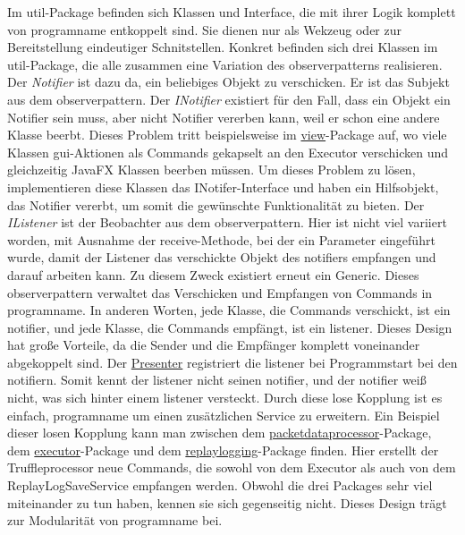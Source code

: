 \medskip
Im util-Package befinden sich Klassen und Interface, die mit ihrer Logik komplett von \gls{programname} entkoppelt sind.
Sie dienen nur als Wekzeug oder zur Bereitstellung eindeutiger Schnitstellen. Konkret befinden sich drei Klassen im util-Package, die alle zusammen eine
Variation des \gls{observerpattern}s realisieren. Der \textit{Notifier} ist dazu da,
ein beliebiges Objekt zu verschicken. Er ist das Subjekt aus
dem \gls{observerpattern}.
\newline
\newline
Der \textit{INotifier} existiert für den Fall, dass ein
Objekt ein Notifier sein muss, aber nicht Notifier vererben kann, weil er
schon eine andere Klasse beerbt. Dieses Problem tritt beispielsweise im
\hyperref[subsec:view]{view}-Package auf, wo viele Klassen \gls{gui}-Aktionen als Commands
gekapselt an den Executor verschicken und gleichzeitig JavaFX Klassen beerben müssen.
Um dieses Problem zu lösen, implementieren diese Klassen das INotifer-Interface
und haben ein Hilfsobjekt, das Notifier vererbt, um somit die gewünschte Funktionalität zu
bieten.
\newline
\newline
Der \textit{IListener} ist der Beobachter aus dem \gls{observerpattern}. Hier ist nicht
viel variiert worden, mit Ausnahme der receive-Methode, bei der ein Parameter eingeführt
wurde, damit der Listener das verschickte Objekt des \gls{notifier}s empfangen und darauf arbeiten kann. Zu diesem Zweck existiert erneut ein Generic.
\newline
\newline
Dieses \gls{observerpattern} verwaltet das Verschicken und Empfangen von Commands in
\gls{programname}. In anderen Worten, jede Klasse, die Commands verschickt, ist ein
\gls{notifier}, und jede Klasse, die Commands empfängt, ist ein \gls{listener}. Dieses Design
hat große Vorteile, da die Sender und die Empfänger komplett voneinander abgekoppelt
sind. Der \hyperref[subsec:presenter]{Presenter} registriert die \gls{listener} bei Programmstart
bei den \gls{notifier}n. Somit kennt der \gls{listener} nicht seinen \gls{notifier}, und der
\gls{notifier} weiß nicht, was sich hinter einem \gls{listener} versteckt. Durch diese lose
Kopplung ist es einfach, \gls{programname} um einen zusätzlichen Service zu erweitern.
\newline
\newline
Ein Beispiel dieser losen Kopplung kann man zwischen dem
\hyperref[subsubsec:packetdataprocessor]{packetdataprocessor}-Package, dem
\hyperref[subsubsec:executor]{executor}-Package und dem
\hyperref[subsubsec:replaylogging]{replaylogging}-Package finden. Hier erstellt
der Truffleprocessor neue Commands, die sowohl von dem Executor als auch von dem
ReplayLogSaveService empfangen werden. Obwohl die drei Packages sehr viel
miteinander zu tun haben, kennen sie sich gegenseitig nicht. Dieses Design
trägt zur Modularität von \gls{programname} bei.
